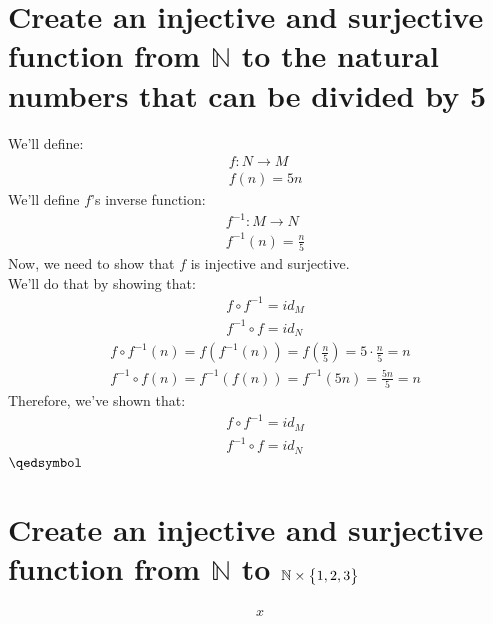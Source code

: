 \documentclass[a4paper, 12pt]{article}
\newcommand{\N}{\ensuremath{\mathbb{N}}}
\newcommand{\eq}[1]{\begin{align*}#1\end{align*}}
\newcommand{\set}[1]{\big{\{} #1 \big{\}}}
\renewcommand{\qed}{\hfill\(\qedsymbol\)}
\begin{document}
\begin{titlepage}
    
\end{titlepage}

\section{Create an injective and surjective function from $\N$ to the natural numbers that can be divided by 5}
We'll define:
\eq{
    &f:N\longrightarrow{M}\\
    &f(n)=5n
}
We'll define $f$'s inverse function:
\eq{
    &f^{-1}:M\longrightarrow{N}\\
    &f^{-1}(n)=\frac{n}{5}
}
Now, we need to show that $f$ is injective and surjective.\\
We'll do that by showing that:
\eq{
    &f\circ{f^{-1}}=id_M\\
    &f^{-1}\circ{f}=id_N
}
\eq{
    &f\circ{f^{-1}}(n)=f(f^{-1}(n))=f(\frac{n}{5})=5\cdot\frac{n}{5}=n\\
    &f^{-1}\circ{f}(n)=f^{-1}(f(n))=f^{-1}(5n)=\frac{5n}{5}=n
}
Therefore, we've shown that:
\eq{
    &f\circ{f^{-1}}=id_M\\
    &f^{-1}\circ{f}=id_N
}
\qed

\section{Create an injective and surjective function from $\N$ to $\N\times\set{1,2,3}$}
\eq{
    x
}
\end{document}
